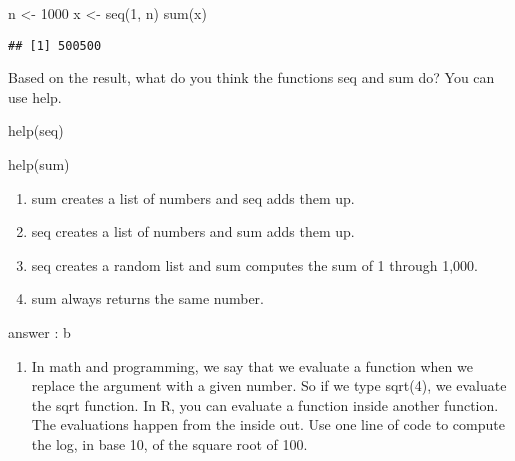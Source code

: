 \documentclass[
]{article}
\newenvironment{Shaded}{\begin{snugshade}}{\end{snugshade}}
\newcommand{\DecValTok}[1]{\textcolor[rgb]{0.00,0.00,0.81}{#1}}
\newcommand{\FunctionTok}[1]{\textcolor[rgb]{0.00,0.00,0.00}{#1}}
\newcommand{\NormalTok}[1]{#1}
\newcommand{\OtherTok}[1]{\textcolor[rgb]{0.56,0.35,0.01}{#1}}
\providecommand{\tightlist}{%
  \setlength{\itemsep}{0pt}\setlength{\parskip}{0pt}}
\begin{document}
\begin{Shaded}
\begin{Highlighting}[]
\NormalTok{n }\OtherTok{\textless{}{-}} \DecValTok{1000}
\NormalTok{x }\OtherTok{\textless{}{-}} \FunctionTok{seq}\NormalTok{(}\DecValTok{1}\NormalTok{, n)}
\FunctionTok{sum}\NormalTok{(x)}
\end{Highlighting}
\end{Shaded}

\begin{verbatim}
## [1] 500500
\end{verbatim}

Based on the result, what do you think the functions seq and sum do? You
can use help.

\begin{Shaded}
\begin{Highlighting}[]
\FunctionTok{help}\NormalTok{(seq)}
\end{Highlighting}
\end{Shaded}

\begin{Shaded}
\begin{Highlighting}[]
\FunctionTok{help}\NormalTok{(sum)}
\end{Highlighting}
\end{Shaded}

\begin{enumerate}
\def\labelenumi{\alph{enumi}.}
\tightlist
\item
  sum creates a list of numbers and seq adds them up.
\item
  seq creates a list of numbers and sum adds them up.
\item
  seq creates a random list and sum computes the sum of 1 through 1,000.
\item
  sum always returns the same number.
\end{enumerate}

answer : b

\begin{enumerate}
\def\labelenumi{\arabic{enumi}.}
\setcounter{enumi}{3}
\tightlist
\item
  In math and programming, we say that we evaluate a function when we
  replace the argument with a given number. So if we type sqrt(4), we
  evaluate the sqrt function. In R, you can evaluate a function inside
  another function. The evaluations happen from the inside out. Use one
  line of code to compute the log, in base 10, of the square root of
  100.
\end{enumerate}
\end{document}
